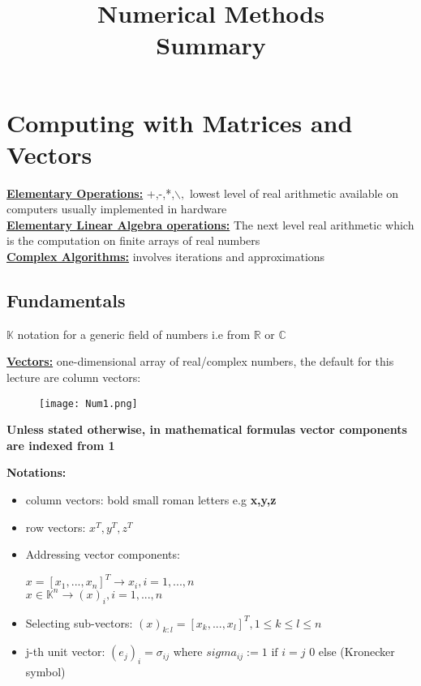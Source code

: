 \documentclass[8pt]{extreport}
\title{Numerical Methods\\Summary}
\begin{document}
	\maketitle
	\newpage


\chapter{Computing with Matrices and Vectors}

\textbf{\underline{Elementary Operations:}} +,-,*,$\backslash,$ lowest level of real arithmetic available on computers usually implemented in hardware\\
\textbf{\underline{Elementary Linear Algebra operations:}} The next level real arithmetic which is the computation on finite arrays of real numbers\\
\textbf{\underline{Complex Algorithms:}} involves iterations and approximations 

\section{Fundamentals}

$\mathbb{K}$ notation for a generic field of numbers i.e from $\mathbb{R}$ or $\mathbb{C}$

\underline{\textbf{Vectors:}} one-dimensional array of real/complex numbers, the default for this lecture are column vectors:

\begin{figure}[H]
\centering
\texttt{[image: Num1.png]}
\end{figure}
\textbf{Unless stated otherwise, in mathematical formulas vector components are indexed from 1}

\textbf{Notations:}
\begin{itemize}
\item column vectors: bold small roman letters e.g \textbf{x,y,z}
\item row vectors: \textbf{$x^T,y^T,z^T$}
\item Addressing vector components:
\begin{center}
$x =[x_1,...,x_n]^T \rightarrow x_i, i = 1,...,n$\\
$x \in \mathbb{K}^n \rightarrow (x)_i, i=1,...,n$
\end{center}
\item Selecting sub-vectors: $(x)_{k:l} = [x_k,...,x_l]^T,  1 \leq k \leq l \leq n$
\item j-th unit vector: $(e_j)_i = \sigma_{ij}$ where $sigma_{ij}:=1 \text{ if } i = j$ 0 else (Kronecker symbol)
\end{itemize}
\end{document}
